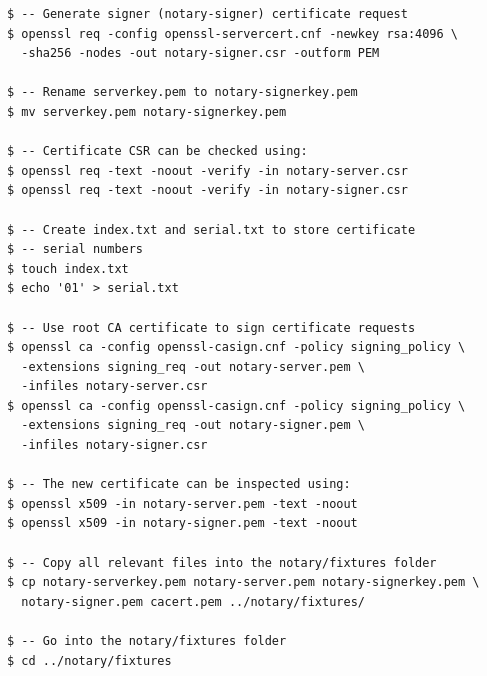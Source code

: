 \documentclass[a4paper,12pt]{article}
\begin{document}
{{\begin{verbatim}
$ -- Generate signer (notary-signer) certificate request
$ openssl req -config openssl-servercert.cnf -newkey rsa:4096 \
  -sha256 -nodes -out notary-signer.csr -outform PEM

$ -- Rename serverkey.pem to notary-signerkey.pem
$ mv serverkey.pem notary-signerkey.pem

$ -- Certificate CSR can be checked using:
$ openssl req -text -noout -verify -in notary-server.csr
$ openssl req -text -noout -verify -in notary-signer.csr

$ -- Create index.txt and serial.txt to store certificate 
$ -- serial numbers
$ touch index.txt
$ echo '01' > serial.txt

$ -- Use root CA certificate to sign certificate requests
$ openssl ca -config openssl-casign.cnf -policy signing_policy \   
  -extensions signing_req -out notary-server.pem \ 
  -infiles notary-server.csr
$ openssl ca -config openssl-casign.cnf -policy signing_policy \
  -extensions signing_req -out notary-signer.pem \
  -infiles notary-signer.csr

$ -- The new certificate can be inspected using:
$ openssl x509 -in notary-server.pem -text -noout
$ openssl x509 -in notary-signer.pem -text -noout

$ -- Copy all relevant files into the notary/fixtures folder
$ cp notary-serverkey.pem notary-server.pem notary-signerkey.pem \
  notary-signer.pem cacert.pem ../notary/fixtures/

$ -- Go into the notary/fixtures folder
$ cd ../notary/fixtures


\end{verbatim}}}
\end{document}
